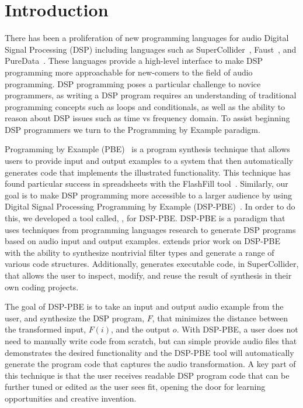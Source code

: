 
\section{Introduction}

There has been a proliferation of new programming languages for audio Digital Signal Processing (DSP) including languages such as SuperCollider~\cite{supercollider}, Faust~\cite{orlarey2009faust}, and PureData~\cite{puredata}.
These languages provide a high-level interface to make DSP programming more approachable for new-comers to the field of audio programming.
DSP programming poses a particular challenge to novice programmers, as writing a DSP program requires an understanding of traditional programming concepts such as loops and conditionals, as well as the ability to reason about DSP issues such as time vs frequency domain.
To assist beginning DSP programmers we turn to the Programming by Example paradigm.

Programming by Example (PBE)~\cite{cypher93,lieberman01} is a program synthesis technique that allows users to provide input and output examples to a system that then automatically generates code that implements the illustrated functionality.
This technique has found particular success in spreadsheets with the FlashFill tool~\cite{flashfill}.
Similarly, our goal is to make DSP programming more accessible to a larger audience by using Digital Signal Processing Programming by Example (DSP-PBE)~\cite{SantolucitoFARM}.
In order to do this, we developed a tool called, \ourTool, for DSP-PBE.
DSP-PBE is a paradigm that uses techniques from programming languages research to generate DSP programs based on audio input and output examples.
\ourTool extends prior work on DSP-PBE~\cite{SantolucitoFARM} with the ability to synthesize nontrivial filter types and generate a range of various code structures.
Additionally, \ourTool generates executable code, in SuperCollider, that allows the user to inspect, modify, and reuse the result of synthesis in their own coding projects.

The goal of DSP-PBE is to take an input and output audio example from the user, and synthesize the DSP program, $F$, that minimizes the distance between the transformed input, $F(i)$, and the output $o$.
With DSP-PBE, a user does not need to manually write code from scratch, but can simple provide audio files that demonstrates the desired functionality and the DSP-PBE tool will automatically generate the program code that captures the audio transformation.
A key part of this technique is that the user receives readable DSP program code that can be further tuned or edited as the user sees fit, opening the door for learning opportunities and creative invention.


